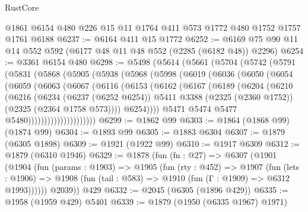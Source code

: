\begin{lexlean}{RustCore}
\begin{coremodule}
    @1861
    @6154
    @480
    @226
    @15
    @11
    @1764
    @411
    @573
    @1772
    @480
    @1752
    @1757
    @1761
    @6188
@6237 := @6164 @411 @15 @1772
@6252 := @6169 @75 @90 @11 @14 @552 @592 (@6177 @48 @11 @48 @552 (@2285 (@6182 @48)) @2296)
@6254 := @3361 @6154 @480
@6298 := @5498
    (@5614
      (@5661
        (@5704
          (@5742
            (@5791
              (@5831
                (@5868
                  (@5905
                    (@5938
                      (@5968
                        (@5998
                          (@6019
                            (@6036
                              (@6050
                                (@6054
                                  (@6059
                                    (@6063
                                      (@6067
                                        (@6116
                                          (@6153
                                            (@6162
                                              (@6167
                                                (@6189
                                                  (@6204
                                                    (@6210
                                                      (@6216
                                                        (@6234
                                                          (@6237 (@6252 @6254))
                                                          @5411
                                                          @3388
                                                          (@2325 (@2360 @1752))
                                                          (@2325 (@2364 @1758 @573))))
                                                      @6254))))
                                              @5471
                                              @5474
                                              @5477
                                              @5480)))))))))))))))))))))
@6299 := @1862 @99
@6303 := @1864 (@1868 @99) (@1874 @99)
@6304 := @1893 @99
@6305 := @1883 @6304
@6307 := @1879 (@6305 @1898)
@6309 := @1921 (@1922 @99)
@6310 := @1917 @6309
@6312 := @1879 (@6310 @1946)
@6329 := @1878
    (fun (fn : @27) =>
    @6307
      (@1901
        (@1904
          (fun (params : @1903) =>
          @1905
            (fun (rty : @452) =>
            @1907
              (fun (lets : @1906) =>
              @1908 (fun (tail : @583) => @1910 (fun (Γ : @1909) => @6312 @1993))))))
        @2039))
    @429
@6332 := @2045 (@6305 (@1896 @429))
@6335 := @1958 (@1959 @429) @5401
@6339 := @1879 (@1950 (@6335 @1967) @1971)

\end{coremodule}
\end{lexlean}
